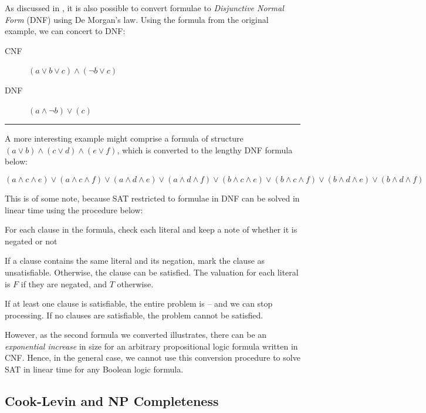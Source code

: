 \documentclass[a4paper,openany]{book}
\def \spacedrule {\textcolor{id7-aubergine}{\hrule}\vspace{1em}}
\begin{document}
As discussed in \citet{miltersen2005converting}, it is also possible to convert formulae to \emph{Disjunctive Normal Form} (DNF) using De Morgan's law. Using the formula from the original example, we can concert to DNF:

    \begin{description}
        \item[CNF] \(
        (a \lor b \lor c) \land (\neg b \lor c)
        \)
        \item[DNF] \(
        (a \land \neg b) \lor (c)
        \)
    \end{description}
    
    \spacedrule{}
    
    A more interesting example might comprise a formula of structure  \(
    (a \lor b) \land (c \lor d) \land (e \lor f)
    \), which is converted to the lengthy DNF formula below:
    
    \[
    (a \land c \land e) \lor (a \land c \land f) \lor (a \land d \land e) \lor (a \land d \land 
    f) \lor (b \land c \land e) \lor (b \land c \land f) \lor (b \land d \land e) \lor (b \land d \land
    f)
    \]
    \vspace{0.25em}

This is of some note, because SAT restricted to formulae in DNF can be solved in linear time using the procedure below:


\begin{outline}
	\1 For each clause in the formula, check each literal and keep a note of whether it is negated or not

	\2 If a clause contains the same literal and its negation, mark the clause as unsatisfiable.
	\2 Otherwise, the clause can be satisfied. The valuation for each literal is $F$ if they are negated, and $T$ otherwise.

	\1 If at least one clause is satisfiable, the entire problem is -- and we can stop processing.
	\1 If no clauses are satisfiable, the problem cannot be satisfied.
\end{outline}



However, as the second formula we converted illustrates, there can be an \emph{exponential increase} in size for an arbitrary propositional logic formula written in CNF. Hence, in the general case, we cannot use this conversion procedure to solve SAT in linear time for any Boolean logic formula.

\subsection{Cook-Levin and NP Completeness}
\end{document}

